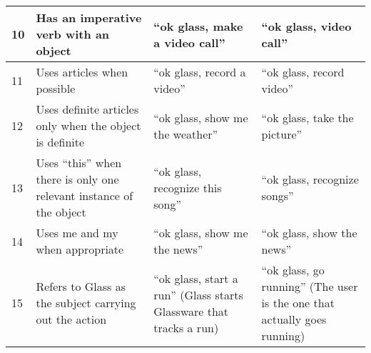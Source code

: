 \begin{table}[ht!]
\begin{tabularx}{\textwidth}{l|X|X|X}
10	&	Has an imperative verb with an object	&	``ok glass, make a video call''	&``ok glass, video call''	\\ \hline
11	&	Uses articles when possible	&	``ok glass, record a video''	&	``ok glass, record video''	\\ \hline
12	&	Uses definite articles only when the object is definite	&	``ok glass, show me the weather''	& ``ok glass, take the picture''	\\ \hline
13	&	Uses ``this'' when there is only one relevant instance of the object	&	``ok glass, recognize this song''	&	``ok glass, recognize songs''	\\ \hline
14	&	Uses me and my when appropriate	&	``ok glass, show me the news''	&	``ok glass, show the news''	\\ \hline
15	&	Refers to Glass as the subject carrying out the action	&	``ok glass, start a run'' (Glass starts Glassware that tracks a run)	&	``ok glass, go running'' (The user is the one that actually goes running)	\\ \hline
		
		\end{tabularx}
	\end{table}